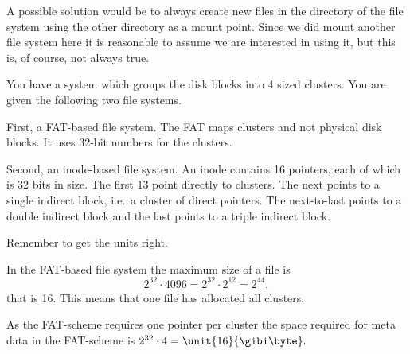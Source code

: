 \documentclass[a4paper]{miunasgn}
\begin{document}
\begin{questions}
\begin{solution}
		A possible solution would be to always create new files in the directory of 
		the file system using the other directory as a mount point.
		Since we did mount another file system here it is reasonable to assume we 
		are interested in using it, but this is, of course, not always true.
	\end{solution}

	\question\label{q:filesystems}
	You have a system which groups the disk blocks into \unit{4}{\kibi\byte} 
	sized clusters.
	You are given the following two file systems.

	First, a FAT-based file system.
	The FAT maps clusters and not physical disk blocks.
	It uses 32-bit numbers for the clusters.

	Second, an inode-based file system.
	An inode contains 16 pointers, each of which is 32 bits in size.
	The first 13 point directly to clusters.
	The next points to a single indirect block, i.e.\ a cluster of direct 
	pointers.
	The next-to-last points to a double indirect block and the last points to 
	a triple indirect block.
	Remember to get the units right.
	\begin{solution}
		In the FAT-based file system the maximum size of a file is \[
			2^{32}\cdot 4096 = 2^{32}\cdot 2^{12} = 2^{44},
		\] that is \unit{16}{\tebi\byte}.
		This means that one file has allocated all clusters.

		As the FAT-scheme requires one pointer per cluster \cite[cf. p.  
		475]{Silberschatz2009osc} the space required for meta data in the 
		FAT-scheme is \(2^{32}\cdot 4 = \unit{16}{\gibi\byte}.\)


\end{solution}
\end{questions}
\end{document}
